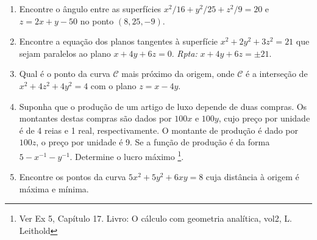 \documentclass[11pt]{article}
\begin{document}
\begin{enumerate}
      \item Encontre o ângulo entre as superfícies $x^{2}/16+y^{2}/25+z^{2}/9=20$ e $z=2x+y-50$ no ponto $(8,25,-9)$.
      
      \item Encontre a equação dos planos tangentes à superfície 
      $x^{2}+2y^{2}+3z^{2}=21$ que sejam paralelos ao plano 
      $x+4y+6z=0$. 
      {\it Rpta:} $x+4y+6z=\pm 21$.
     \item Qual é o ponto da curva $\mathcal{C}$ mais próximo da origem, onde $\mathcal{C}$ é a interseção de  $x^{2}+4z^{2}+4y^{2}=4$ com o plano $z=x-4y$.
       
     \item Suponha que o produção de um artigo de luxo depende de duas compras.  Os montantes destas compras são dados por $100x$ e $100y$, cujo preço por unidade é de 4 reias e 1 real, respectivamente. O montante de produção é dado por $100z$, o preço por unidade é 9. Se a função de produção é da forma $5-x^{-1}-y^{-1}$. Determine o lucro máximo \footnote{Ver Ex 5, Capítulo 17. Livro: O cálculo com geometria analítica, vol2, L. Leithold}. 

     \item Encontre os pontos da curva $5x^{2}+5y^{2}+6xy=8$ cuja distância à origem é máxima e mínima.  
     \end{enumerate}
\end{document}
